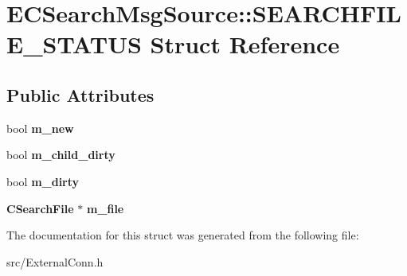 \section{ECSearchMsgSource::SEARCHFILE\_\-STATUS Struct Reference}
\label{structECSearchMsgSource_1_1SEARCHFILE__STATUS}
\subsection*{Public Attributes}
\begin{DoxyCompactItemize}
\item 
bool {\bfseries m\_\-new}\label{structECSearchMsgSource_1_1SEARCHFILE__STATUS_a41ebe7f9efd430f381e710c89987d1b8}

\item 
bool {\bfseries m\_\-child\_\-dirty}\label{structECSearchMsgSource_1_1SEARCHFILE__STATUS_a4d5f5f3492a0937bfc41671b39df83f5}

\item 
bool {\bfseries m\_\-dirty}\label{structECSearchMsgSource_1_1SEARCHFILE__STATUS_a308135063099460a6f22f573b0ef6699}

\item 
{\bf CSearchFile} $\ast$ {\bfseries m\_\-file}\label{structECSearchMsgSource_1_1SEARCHFILE__STATUS_a1a7a6da8c25e3494e4bfc7457b472a1c}

\end{DoxyCompactItemize}


The documentation for this struct was generated from the following file:\begin{DoxyCompactItemize}
\item 
src/ExternalConn.h\end{DoxyCompactItemize}
